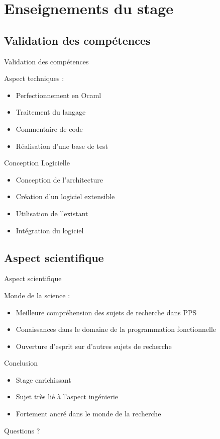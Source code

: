 \documentclass[compress]{beamer}
\newenvironment{tframe}[1]{
  \subsection{#1}
  \begin{frame}{#1}
  }{
  \end{frame}
  }
\begin{document}
\section{Enseignements du stage}

\begin{tframe}{Validation des compétences}
      Aspect techniques :
      \begin{itemize}
        \item Perfectionnement en Ocaml
        \item Traitement du langage
        \item Commentaire de code
        \item Réalisation d'une base de test
      \end{itemize}

  Conception Logicielle
      \begin{itemize}
        \item Conception de l'architecture
        \item Création d'un logiciel extensible
        \item Utilisation de l'existant
        \item Intégration du logiciel
      \end{itemize}
\end{tframe}

\begin{tframe}{Aspect scientifique}
      Monde de la science :
      \begin{itemize}
        \item Meilleure compréhension des sujets de recherche dans PPS
        \item Conaissances dans le domaine de la programmation fonctionnelle
        \item Ouverture d'esprit sur d'autres sujets de recherche
      \end{itemize}
\end{tframe}

\begin{frame}{Conclusion}
  \begin{itemize}
    \item Stage enrichissant
    \item Sujet très lié à l'aspect ingénierie
    \item Fortement ancré dans le monde de la recherche
  \end{itemize}
    \vfill
  \begin{center} \large Questions ? \end{center}
\end{frame}
\end{document}
